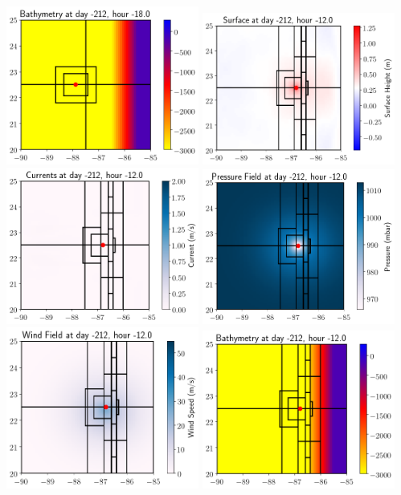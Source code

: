 \documentclass[11pt]{article}
\begin{document}
\vskip 10pt 
\includegraphics[width=0.475\textwidth]{frame0003fig301.png}
\vskip 10pt 
\includegraphics[width=0.475\textwidth]{frame0004fig0.png}
\includegraphics[width=0.475\textwidth]{frame0004fig1.png}
\vskip 10pt 
\includegraphics[width=0.475\textwidth]{frame0004fig2.png}
\includegraphics[width=0.475\textwidth]{frame0004fig4.png}
\vskip 10pt 
\includegraphics[width=0.475\textwidth]{frame0004fig301.png}
\end{document}
